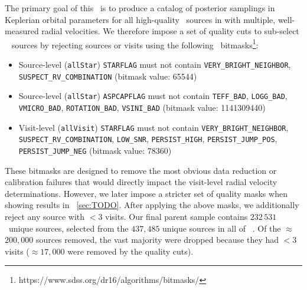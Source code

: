 \documentclass[modern]{aastex63}
\newcommand{\nsources}{\ensuremath{232\,531}}
\begin{document}
The primary goal of this \documentname\ is to produce a catalog of posterior
samplings in Keplerian orbital parameters for all high-quality \apogee\ sources
in  with multiple, well-measured radial velocities.
We therefore impose a set of quality cuts to sub-select \apogee\  sources
by rejecting sources or visits using the following \apogee\
bitmasks\footnote{https://www.sdss.org/dr16/algorithms/bitmasks/}:
\begin{itemize}
    \item Source-level (\texttt{allStar}) \texttt{STARFLAG} must not contain
    \texttt{VERY\_BRIGHT\_NEIGHBOR}, \texttt{SUSPECT\_RV\_COMBINATION} (bitmask
    value: 65544)
    \item Source-level (\texttt{allStar}) \texttt{ASPCAPFLAG} must not contain
    \texttt{TEFF\_BAD}, \texttt{LOGG\_BAD}, \texttt{VMICRO\_BAD},
    \texttt{ROTATION\_BAD}, \texttt{VSINI\_BAD} (bitmask value: 1141309440)
    \item Visit-level (\texttt{allVisit}) \texttt{STARFLAG} must not contain
    \texttt{VERY\_BRIGHT\_NEIGHBOR}, \texttt{SUSPECT\_RV\_COMBINATION},
    \texttt{LOW\_SNR}, \texttt{PERSIST\_HIGH}, \texttt{PERSIST\_JUMP\_POS},
    \texttt{PERSIST\_JUMP\_NEG} (bitmask value: 78360)
\end{itemize}
These bitmasks are designed to remove the most obvious data reduction or
calibration failures that would directly impact the visit-level radial velocity
determinations.
However, we later impose a stricter set of quality masks when showing results in
\sectionname~\ref{sec:TODO}.
After applying the above masks, we additionally reject any source with $<3$
visits.
Our final parent sample contains \nsources\ unique sources, selected from the
$437,485$ unique sources in all of \apogee\ \dr{16}.
Of the $\approx$$200,000$ sources removed, the vast majority were dropped
because they had $<3$ visits ($\approx$$17,000$ were removed by the quality
cuts).
\end{document}
